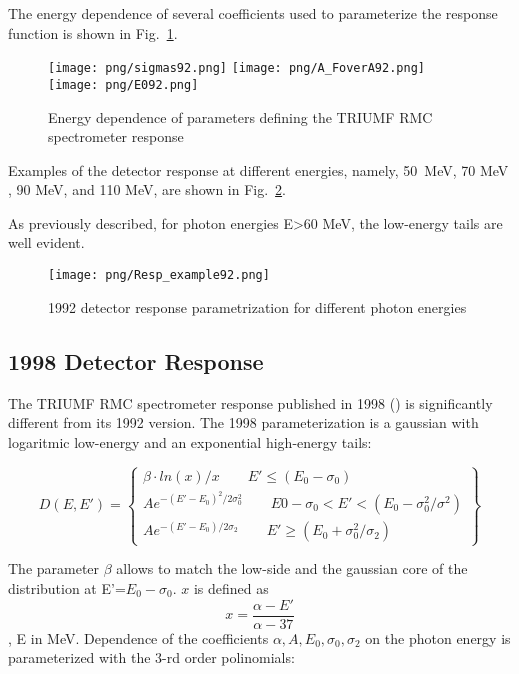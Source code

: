 The energy dependence of several coefficients used to parameterize the response
function is shown in Fig.~\ref{fig:parameterDependence}.

\begin{figure}[!h]
  \begin{center}
    \texttt{[image: png/sigmas92.png]} 
    \texttt{[image: png/A\_FoverA92.png]} 
    \texttt{[image: png/E092.png]} 
  \end{center}
  \caption{
    Energy dependence of parameters defining the TRIUMF RMC spectrometer response
    \cite{RMC_1992_PhysRevC.46.1094}
  }
  \label{fig:parameterDependence}
\end{figure}

Examples of the detector response at different energies, namely, \mbox{50 MeV},
70 MeV , 90 MeV, and 110 MeV, are shown in Fig.~\ref{fig:92ResponseExample}.

As previously described, for photon energies E>60 MeV, the low-energy tails are well evident.

\begin{figure}[!h]
\centering
\texttt{[image: png/Resp\_example92.png]}
\caption{1992 detector response parametrization for different photon energies}
\label{fig:92ResponseExample}
\end{figure}


\subsection { 1998 Detector Response }

The TRIUMF RMC spectrometer response published in 1998 (\cite{RMC_1998_PhysRevC.58.1767})
is significantly different from its 1992 version.
The 1998 parameterization is a gaussian with logaritmic low-energy and an exponential
high-energy tails:

\begin{equation}
  D(E,E')= \left\{
    \begin{array}{ll}
      \beta \cdot ln(x)/x    \qquad E' \leq (E_0-\sigma_0) \\
      Ae^{-(E'-E_0)^2/2\sigma_0^2} \qquad E0-\sigma_0<E'<(E_0-\sigma_0^2/\sigma^2) \\
      Ae^{-(E'-E_0)/2\sigma_2}    \qquad E' \geq (E_0+\sigma_0^2/\sigma_2)
    \end{array}
  \right\}
\end{equation}

The parameter $\beta$  allows to match the low-side and the gaussian core
of the distribution at E'=$E_0-\sigma_0$.
$x$ is defined as
$$
  x= \frac{\alpha- E'}{\alpha -37} 
$$, E in MeV.
Dependence of the coefficients $\alpha, A, E_0, \sigma_0, \sigma_2$ on the photon energy
is parameterized with the 3-rd order polinomials:

